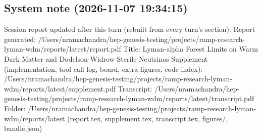 \documentclass[11pt,a4paper]{article}
\begin{document}
\subsection*{System note \small(2026-11-07 19:34:15)}
Session report updated after this turn (rebuilt from every turn's section): Report generated: /Users/nramachandra/hep-genesis-testing/projects/ramp-research-lyman-wdm/reports/latest/report.pdf Title: Lyman-alpha Forest Limits on Warm Dark Matter and Dodelson-Widrow Sterile Neutrinos Supplement (implementation, tool-call log, board, extra figures, code index): /Users/nramachandra/hep-genesis-testing/projects/ramp-research-lyman-wdm/reports/latest/supplement.pdf Transcript: /Users/nramachandra/hep-genesis-testing/projects/ramp-research-lyman-wdm/reports/latest/transcript.pdf Folder: /Users/nramachandra/hep-genesis-testing/projects/ramp-research-lyman-wdm/reports/latest (report.tex, supplement.tex, transcript.tex, figures/, bundle.json)
\end{document}
